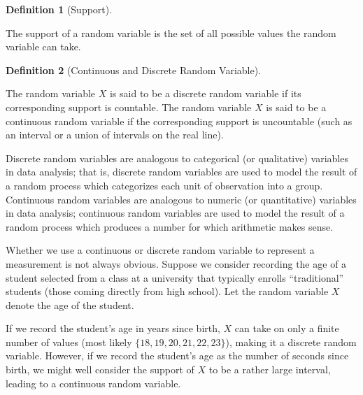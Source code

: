 \documentclass[
  letterpaper,
  DIV=11,
  numbers=noendperiod]{scrreprt}
\theoremstyle{definition}
\newtheorem{definition}{Definition}[chapter]
\theoremstyle{plain}
\theoremstyle{definition}
\theoremstyle{remark}
\begin{document}
\begin{definition}[Support]\protect\hypertarget{def-support}{}\label{def-support}

The support of a random variable is the set of all possible values the
random variable can take.

\end{definition}

\begin{definition}[Continuous and Discrete Random
Variable]\protect\hypertarget{def-rvtypes}{}\label{def-rvtypes}

The random variable \(X\) is said to be a discrete random variable if
its corresponding support is countable. The random variable \(X\) is
said to be a continuous random variable if the corresponding support is
uncountable (such as an interval or a union of intervals on the real
line).

\end{definition}

Discrete random variables are analogous to categorical (or qualitative)
variables in data analysis; that is, discrete random variables are used
to model the result of a random process which categorizes each unit of
observation into a group. Continuous random variables are analogous to
numeric (or quantitative) variables in data analysis; continuous random
variables are used to model the result of a random process which
produces a number for which arithmetic makes sense.

\begin{tcolorbox}[enhanced jigsaw, breakable, colframe=quarto-callout-warning-color-frame, titlerule=0mm, arc=.35mm, coltitle=black, opacitybacktitle=0.6, leftrule=.75mm, opacityback=0, left=2mm, toprule=.15mm, colbacktitle=quarto-callout-warning-color!10!white, title=\textcolor{quarto-callout-warning-color}{\faExclamationTriangle}\hspace{0.5em}{Warning}, bottomtitle=1mm, toptitle=1mm, rightrule=.15mm, bottomrule=.15mm, colback=white]

Whether we use a continuous or discrete random variable to represent a
measurement is not always obvious. Suppose we consider recording the age
of a student selected from a class at a university that typically
enrolls ``traditional'' students (those coming directly from high
school). Let the random variable \(X\) denote the age of the student.

If we record the student's age in years since birth, \(X\) can take on
only a finite number of values (most likely
\(\{18, 19, 20, 21, 22, 23\}\)), making it a discrete random variable.
However, if we record the student's age as the number of seconds since
birth, we might well consider the support of \(X\) to be a rather large
interval, leading to a continuous random variable.

\end{tcolorbox}
\end{document}
